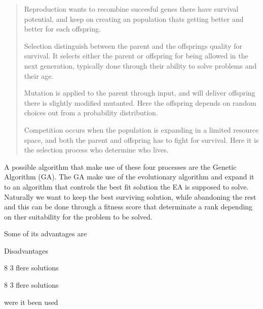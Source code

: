 \begin{quote}
Reproduction wants to recombine succesful genes there have survival potential, and keep on creating an population thats getting better and better for each offspring. \cite{Fogel1997}

Selection distinguish between the parent and the offsprings quality for survival. It selects either the parent or offspring for being allowed in the next generation, typically done through their ability to solve problems and their age.   \cite{Smith2007}



Mutation is applied to the parent through input, and will deliver offspring there is slightly modified mutanted. Here the offspring depends on random choices out from a probability distribution.  \cite{Smith2007}


Competition occurs when the population is expanding in a limited resource space, and both the parent and offspring has to fight for survival. Here it is the selection process who determine who lives. \cite{Fogel1997}

\end{quote}

A possible algorithm that make use of these four processes are the Genetic Algorithm (GA). The GA make use of the evolutionary algorithm and expand it to an algorithm that controls the best fit solution the EA is supposed to solve. Naturally we want to keep the best surviving solution, while abandoning the rest and this can be done through a fitness score that determinate a rank depending on ther suitability for the problem to be solved. \cite {Sivanandam2008}

Some of its advantages are  

Disadvantages  

8
3 flere solutions 

8
3 flere solutions 



were it been used 




